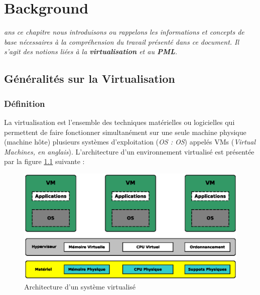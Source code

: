 \let\textcircled=\pgftextcircled
\chapter{Background}
\label{chap:background}

\textit{ans ce chapitre nous introduisons ou rappelons les informations et concepts de base nécessaires à la compréhension du travail présenté dans ce document. Il s'agit des notions liées à la \textbf{virtualisation} et au \textbf{PML}.}


\newpage    
\section{Généralités sur la Virtualisation}

\subsection{Définition}
\par\noindent La virtualisation est l’ensemble des techniques matérielles ou logicielles qui permettent de faire fonctionner simultanément sur une seule machine physique (machine hôte) plusieurs systèmes d’exploitation (\textit{\acs{OS} : \acl{OS}}) appelés \ac{VMs} (\textit{Virtual Machines, en anglais}). L'architecture d'un environnement virtualisé est présentée par la figure \ref{fig:environnement_virtualise} suivante :\\

\begin{figure}[H]
    \centering
    \includegraphics[scale=.7]{chapters/1/fig1/environnement_virtualise}
    \caption{Architecture d'un système virtualisé}
    \label{fig:environnement_virtualise}
\end{figure}


